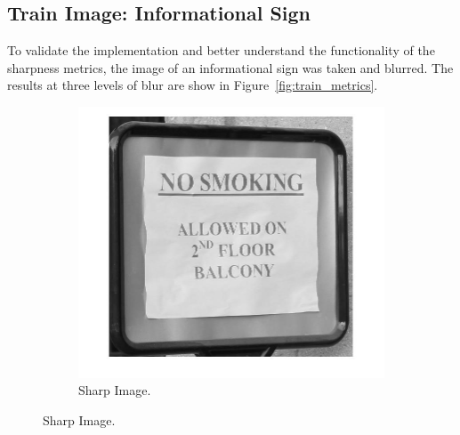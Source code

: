 \subsection{Train Image: Informational Sign}
To validate the implementation and better understand the functionality of the sharpness metrics, the image of an informational sign was taken and blurred. The results at three levels of blur are show in Figure~\ref{fig:train_metrics}.

\begin{figure}[h!]
        \centering
        \begin{subfigure}[b]{0.35\textwidth}
                \centering
                \includegraphics[width=\textwidth]{true.jpg}
                \caption{Sharp Image.}
               

\end{subfigure}
\end{figure}
